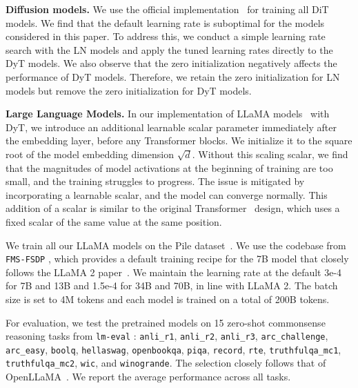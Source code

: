 \documentclass[]{fairmeta}
\renewcommand{\paragraph}[1]{\vspace{1.25mm}\noindent\textbf{#1}}
\begin{document}
\paragraph{Diffusion models.} We use the official implementation~\citep{dit} for training all DiT models. We find that the default learning rate is suboptimal for the models considered in this paper. To address this, we conduct a simple learning rate search with the LN models and apply the tuned learning rates directly to the DyT models. We also observe that the zero initialization negatively affects the performance of DyT models. Therefore, we retain the zero initialization for LN models but remove the zero initialization for DyT models.

\paragraph{Large Language Models.} In our implementation of LLaMA models~\citep{touvron2023llama, touvron2023llama2, dubey2024llama} with DyT, we introduce an additional learnable scalar parameter immediately after the embedding layer, before any Transformer blocks. We initialize it to the square root of the model embedding dimension $\sqrt{d}$. Without this scaling scalar, we find that the magnitudes of model activations at the beginning of training are too small, and the training struggles to progress. The issue is mitigated by incorporating a learnable scalar, and the model can converge normally. This addition of a scalar is similar to the original Transformer~\citep{vaswani2017attention} design, which uses a fixed scalar of the same value at the same position.

We train all our LLaMA models on the Pile dataset~\citep{pile}. We use the codebase from \texttt{FMS-FSDP} \citep{fms-fsdp}, which provides a default training recipe for the 7B model that closely follows the LLaMA 2 paper~\citep{touvron2023llama2}. We maintain the learning rate at the default 3e-4 for 7B and 13B and 1.5e-4 for 34B and 70B, in line with LLaMA 2.
The batch size is set to 4M tokens
and each model is trained on a total of 200B tokens.


For evaluation, we test the pretrained models on 15 zero-shot commonsense reasoning tasks from \texttt{lm-eval} \citep{eval-harness}: \texttt{anli\_r1}, \texttt{anli\_r2}, \texttt{anli\_r3}, \texttt{arc\_challenge}, \texttt{arc\_easy}, \texttt{boolq}, \texttt{hellaswag}, \texttt{openbookqa}, \texttt{piqa}, \texttt{record}, \texttt{rte}, \texttt{truthfulqa\_mc1}, \texttt{truthfulqa\_mc2}, \texttt{wic}, and \texttt{winogrande}. The selection closely follows that of OpenLLaMA~\citep{openlm2023openllama}. We report the average performance across all tasks.
\end{document}
